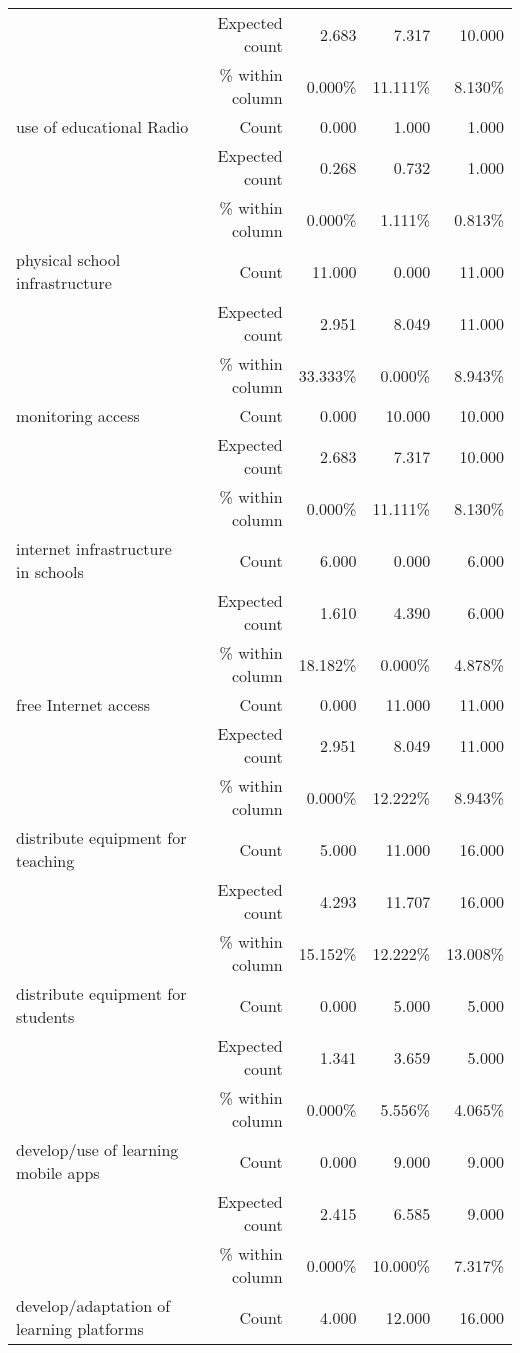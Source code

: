 \documentclass[6pt, oneside]{article}   	%
\begin{document}
\begin{table}[h]
{\begin{tabular}{lrrrr}
			 & Expected count & 2.683 & 7.317 & 10.000  \\
			 &  \% within column & 0.000\% & 11.111\% & 8.130\%  \\
			use of educational Radio & Count & 0.000 & 1.000 & 1.000  \\
			 & Expected count & 0.268 & 0.732 & 1.000  \\
			 &  \% within column & 0.000\% & 1.111\% & 0.813\%  \\
			physical school infrastructure & Count & 11.000 & 0.000 & 11.000  \\
			 & Expected count & 2.951 & 8.049 & 11.000  \\
			 &  \% within column & 33.333\% & 0.000\% & 8.943\%  \\
			monitoring access & Count & 0.000 & 10.000 & 10.000  \\
			 & Expected count & 2.683 & 7.317 & 10.000  \\
			 &  \% within column & 0.000\% & 11.111\% & 8.130\%  \\
			internet infrastructure in schools & Count & 6.000 & 0.000 & 6.000  \\
			 & Expected count & 1.610 & 4.390 & 6.000  \\
			 &  \% within column & 18.182\% & 0.000\% & 4.878\%  \\
			free Internet access & Count & 0.000 & 11.000 & 11.000  \\
			 & Expected count & 2.951 & 8.049 & 11.000  \\
			 &  \% within column & 0.000\% & 12.222\% & 8.943\%  \\
			distribute equipment for teaching & Count & 5.000 & 11.000 & 16.000  \\
			 & Expected count & 4.293 & 11.707 & 16.000  \\
			 &  \% within column & 15.152\% & 12.222\% & 13.008\%  \\
			distribute equipment for students & Count & 0.000 & 5.000 & 5.000  \\
			 & Expected count & 1.341 & 3.659 & 5.000  \\
			 &  \% within column & 0.000\% & 5.556\% & 4.065\%  \\
			develop/use of learning mobile apps & Count & 0.000 & 9.000 & 9.000  \\
			 & Expected count & 2.415 & 6.585 & 9.000  \\
			 &  \% within column & 0.000\% & 10.000\% & 7.317\%  \\
			develop/adaptation of learning platforms & Count & 4.000 & 12.000 & 16.000  \\

\end{tabular}}
\end{table}
\end{document}
